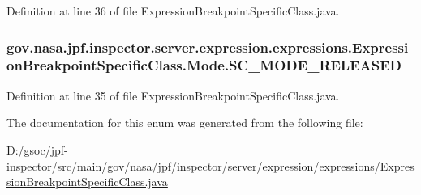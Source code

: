 Definition at line 36 of file Expression\+Breakpoint\+Specific\+Class.\+java.

\subsubsection[{\texorpdfstring{S\+C\+\_\+\+M\+O\+D\+E\+\_\+\+R\+E\+L\+E\+A\+S\+ED}{SC_MODE_RELEASED}}]{\setlength{\rightskip}{0pt plus 5cm}gov.\+nasa.\+jpf.\+inspector.\+server.\+expression.\+expressions.\+Expression\+Breakpoint\+Specific\+Class.\+Mode.\+S\+C\+\_\+\+M\+O\+D\+E\+\_\+\+R\+E\+L\+E\+A\+S\+ED}\hypertarget{enumgov_1_1nasa_1_1jpf_1_1inspector_1_1server_1_1expression_1_1expressions_1_1_expression_breakpoint_specific_class_1_1_mode_a0c7115882769cddd4468e56c3d612ad2}{}\label{enumgov_1_1nasa_1_1jpf_1_1inspector_1_1server_1_1expression_1_1expressions_1_1_expression_breakpoint_specific_class_1_1_mode_a0c7115882769cddd4468e56c3d612ad2}


Definition at line 35 of file Expression\+Breakpoint\+Specific\+Class.\+java.



The documentation for this enum was generated from the following file\+:\begin{DoxyCompactItemize}
\item 
D\+:/gsoc/jpf-\/inspector/src/main/gov/nasa/jpf/inspector/server/expression/expressions/\hyperlink{_expression_breakpoint_specific_class_8java}{Expression\+Breakpoint\+Specific\+Class.\+java}\end{DoxyCompactItemize}
